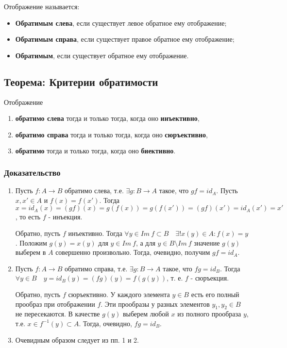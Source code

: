 \documentclass{article}
\begin{document}
Отображение называется:
\begin{itemize}
\item \textbf{Обратимым слева}, если существует левое обратное ему отображение;
\item \textbf{Обратимым справа}, если существует правое обратное ему отображение;
\item \textbf{Обратимым}, если существует обратное ему отображение.
\end{itemize}

\subsection{Теорема: Критерии обратимости}
Отображение
\begin{enumerate}
\item \textbf{обратимо слева} тогда и только тогда, когда оно \textbf{инъективно},
\item \textbf{обратимо справа} тогда и только тогда, когда оно \textbf{сюръективно},
\item \textbf{обратимо} тогда и только тогда, когда оно \textbf{биективно}.
\end{enumerate}

\subsubsection*{Доказательство}
\begin{enumerate}
\item Пусть $f: A \rightarrow B$ обратимо слева, т.е. $\exists g : B \rightarrow A$ такое, что $gf = id_A$. Пусть $x, x' \in A$ и $f(x) = f(x')$. Тогда $x = id_A(x) = (gf)(x) = g(f(x)) = g(f(x')) = (gf)(x') = id_A(x') = x'$, то есть $f$ - инъекция.

Обратно, пусть $f$ инъективно. Тогда $\forall y \in Im~f \subset B \quad \exists ! x(y) \in A : f(x) = y$. Положим $g(y) = x(y)$ для $y \in Im~f$, а для $y \in B \setminus Im~f$ значение $g(y)$ выберем в $A$ совершенно произвольно. Тогда, очевидно, получим $gf = id_A$.

\item Пусть $f : A \rightarrow B$ обратимо справа, т.е. $\exists g : B \rightarrow A$ такое, что $fg = id_B$. Тогда $\forall y \in B \quad y = id_B(y) = (fg)(y) = f(g(y))$, т. е. $f$ - сюръекция.

Обратно, пусть $f$ сюръективно. У каждого элемента $y \in B$ есть его полный прообраз при отображении $f$. Эти прообразы у разных элементов $y_1, y_2 \in B$ не пересекаются. В качестве $g(y)$ выберем любой $x$ из полного прообраза $y$, т.е. $x \in f^{-1}(y) \subset A$. Тогда, очевидно, $fg = id_B$.

\item Очевидным образом следует из пп. 1 и 2.
\end{enumerate}
\end{document}
